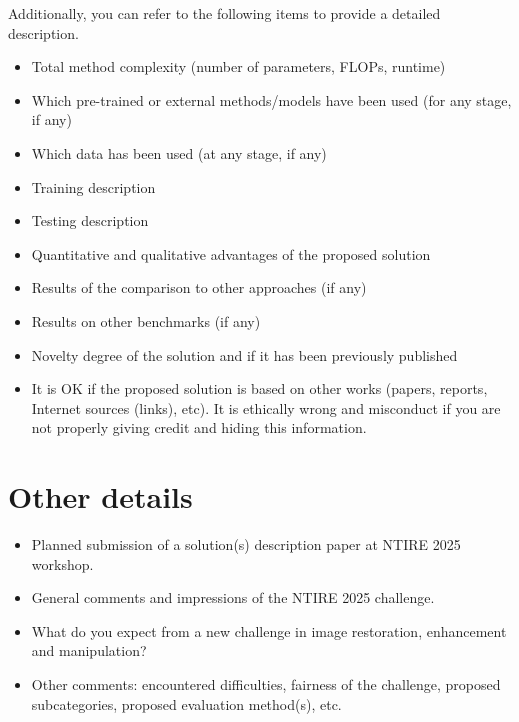 \documentclass[10pt,twocolumn,letterpaper]{article}
\begin{document}
Additionally, you can refer to the following items to provide a detailed description.
\begin{itemize}
\item Total method complexity (number of parameters, FLOPs, runtime)
\item Which pre-trained or external methods/models have been used (for any stage, if any) 
\item Which data has been used (at any stage, if any) 
\item Training description
\item Testing description
\item Quantitative and qualitative advantages of the proposed solution
\item Results of the comparison to other approaches (if any)
\item Results on other benchmarks (if any)
\item Novelty degree of the solution and if it has been previously published
\item It is OK if the proposed solution is based on other works (papers, reports, Internet sources (links), etc). It is ethically wrong and misconduct if you are not properly giving credit and hiding this information.
\end{itemize}

\section{Other details}
\begin{itemize}
\item Planned submission of a solution(s) description paper at NTIRE 2025 workshop.
\item General comments and impressions of the NTIRE 2025 challenge. 
\item What do you expect from a new challenge in image restoration, enhancement and manipulation?
\item Other comments: encountered difficulties, fairness of the challenge, proposed subcategories, proposed evaluation method(s), etc.
\end{itemize}

{\small


}
\end{document}
